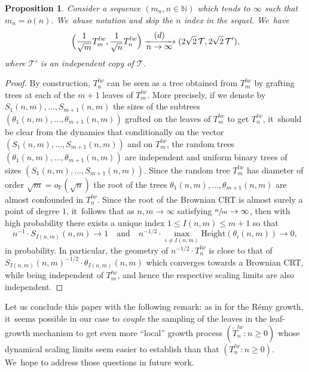 \documentclass[11pt]{article}
\newcommand{\N}{\mathbb{N}}
\newcommand{\T}{\mathcal{T}}\let\CRT\T\let\tbr\T
\newtheorem{prop}[thm]{Proposition}
\theoremstyle{definition}
\begin{document}
\begin{prop}\label{prop:pairedindep}
Consider a sequence $(m_n,n\in\N)$ which tends to $\infty$ such that $m_n=o(n)$. We~abuse notation and skip the $n$ index in the sequel. We~have
\[
\Bigl(\frac{1}{\sqrt{m}}T^{lw}_m,\frac{1}{\sqrt{n}}T^{lw}_n\Bigr) \xrightarrow[\textstyle n\to\infty]{\textstyle(d)} (2\sqrt{2}\,\T,2\sqrt{2}\,\T'),
\]
where $\T'$ is an independent copy of $\T$.
\end{prop}

\begin{proof} By construction, $T^{lw}_n$ can be seen as a tree obtained from $T^{lw}_m$ by grafting trees at each of the $m+1$ leaves of $T^{lw}_m$. More precisely, if we denote by $S_1(n,m),\dots , S_{m+1}(n,m)$ the sizes of the subtrees $(\theta_1(n,m), \dots , \theta_{m+1}(n,m))$ grafted on the leaves of $T^{lw}_m$ to get $T^{lw}_n$, it~should be clear from the dynamics that conditionally on the vector $(S_1(n,m), \dots , S_{m+1}(n,m))$ and on $T^{lw}_m$, the random trees $(\theta_1(n,m), \dots , \theta_{m+1}(n,m))$ are independent and uniform binary trees of sizes $(S_1(n,m), \dots , S_{m+1}(n,m))$. Since the random tree $T^{lw}_m$ has diameter of order $ \sqrt{m} = o_{\mathbb{P}}(\sqrt{n})$ the root of the trees $\theta_1(n,m), \dots , \theta_{m+1}(n,m)$ are almost confounded in $T^{lw}_n$. Since the root of the Brownian CRT is almost surely a point of degree $1$, it~follows that as $n,m \to \infty$ satisfying $ \sfrac{n}{m} \to \infty$, then with high probability there exists a unique index $1 \leq I(n,m) \leq m+1$ so that
\[
n^{-1} \cdot S_{I(n,m)}(n,m) \to 1 \quad \text{and} \quad n^{-1/2}\cdot \max_{i \ne I(n,m)} \mathrm{Height}(\theta_i(n,m)) \to 0,
\]
in probability. In particular, the geometry of $ n^{-1/2}\cdot T^{lw}_n$ is close to that of $ S_{I(n,m)}(n,m)^{-1/2}\cdot \theta_{I(n,m)}(n,m)$ which converges towards a Brownian CRT, while being independent of $T^{lw}_m$, and hence the respective scaling limits are also independent.
\end{proof}

Let us conclude this paper with the following remark: as in \cite{bacher2017efficient} for the Rémy growth, it~seems possible in our case to \textit{couple} the sampling of the leaves in the leaf-growth mechanism to get even more ``local'' growth process $(\tilde{T}_n^{lw} : n \geq 0)$ whose dynamical scaling limits seem easier to establish than that $({T}_n^{lw} : n \geq 0)$. We~hope to address those questions in future work.

\appendix
\end{document}
